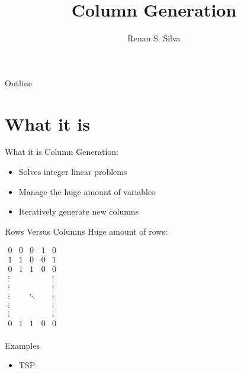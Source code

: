 \documentclass{beamer}
\title{Column Generation}
\subtitle{}
\author{Renan S. Silva\inst{1}}
\institute[Udesc] %
{
  \inst{1}%
  Computer Science Department\\
  Santa Catarina State University
}
\begin{document}
\begin{frame}
  \titlepage
\end{frame}

\begin{frame}{Outline}
  \tableofcontents
\end{frame}

\section{What it is}  

\begin{frame}{What it is}
    Column Generation:
    
    \begin{itemize}
        \item Solves integer linear problems
        \item Manage the huge amount of variables
        \item Iteratively generate new columns
    \end{itemize}
\end{frame}

\begin{frame}{Rows Versus Columns}
    Huge amount of rows:
    
    \begin{minipage}{0.49\textwidth}
    $
     \begin{matrix}
      0         & 0 & 0      & 1 & 0 \\
      1         & 1 & 0      & 0 & 1 \\
      0         & 1 & 1      & 0 & 0 \\
         \vdots &   &        &   & \vdots \\
         \vdots &   &        &   & \vdots \\
      \vdots    &   & \ddots &   & \vdots \\
         \vdots &   &        &   & \vdots \\
         \vdots &   &        &   & \vdots \\
      0         & 1 & 1      & 0 & 0 \\
     \end{matrix}
    $
    \end{minipage}
    \begin{minipage}{0.49\textwidth}
    Examples
    \begin{itemize}
        \item TSP
    \end{itemize}
    \end{minipage}
\end{frame}
\end{document}
